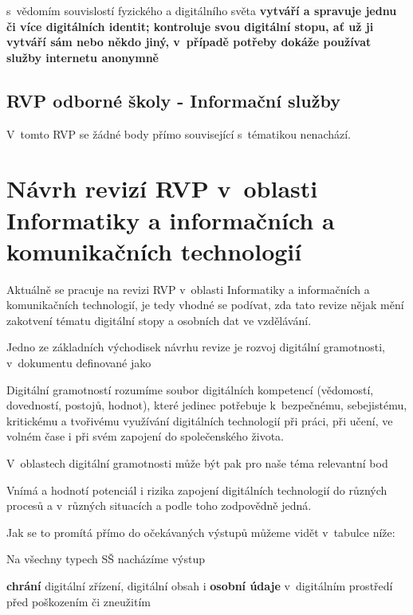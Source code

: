 \begin{displayquote}
s~vědomím souvislostí fyzického a digitálního světa \textbf{vytváří a spravuje jednu či více digitálních identit; kontroluje svou digitální stopu, ať už ji vytváří sám nebo někdo jiný, v~případě potřeby dokáže používat služby internetu anonymně}
\end{displayquote}

\subsection{RVP odborné školy - Informační služby}

V~tomto RVP se žádné body přímo související s~tématikou nenachází.

\section{Návrh revizí RVP v~oblasti Informatiky a informačních a komunikačních technologií}

Aktuálně se pracuje na revizi RVP v~oblasti Informatiky a informačních a komunikačních technologií, je tedy vhodné se podívat, zda tato revize nějak mění zakotvení tématu digitální stopy a osobních dat ve vzdělávání.

Jedno ze základních východisek návrhu revize je rozvoj digitální gramotnosti, v~dokumentu definované jako 

\begin{displayquote}
Digitální gramotností rozumíme soubor digitálních kompetencí (vědomostí, dovedností, postojů, hodnot), které jedinec potřebuje k bezpečnému, sebejistému, kritickému a tvořivému využívání digitálních technologií při práci, při učení, ve volném čase i při svém zapojení do společenského života.
\end{displayquote}

V~oblastech digitální gramotnosti může být pak pro naše téma relevantní bod

\begin{displayquote}
Vnímá a hodnotí potenciál i rizika zapojení digitálních technologií do různých procesů a v různých situacích a podle toho zodpovědně jedná.
\end{displayquote}

Jak se to promítá přímo do očekávaných výstupů můžeme vidět v~tabulce níže:


Na všechny typech SŠ nacházíme výstup

\begin{displayquote}
\textbf{chrání} digitální zřízení, digitální obsah i \textbf{osobní údaje} v~digitálním prostředí před poškozením či zneužitím
\end{displayquote}

